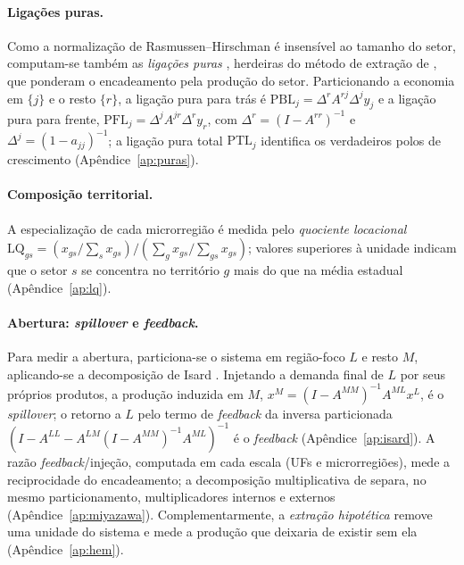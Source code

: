 \documentclass[11pt,a4paper]{article}
\begin{document}
\paragraph{Ligações puras.}
Como a normalização de Rasmussen--Hirschman é insensível ao tamanho do setor, computam-se
também as \emph{ligações puras} \citep{guilhoto2005linkages,millerblair2009}, herdeiras do
método de extração de \citet{cella1984}, que ponderam o encadeamento pela produção do setor.
Particionando a economia em $\{j\}$ e o resto $\{r\}$, a ligação pura para trás é
$\mathrm{PBL}_j=\Delta^{r}A^{rj}\Delta^{j}y_j$ e a ligação pura para frente,
$\mathrm{PFL}_j=\Delta^{j}A^{jr}\Delta^{r}y_r$, com $\Delta^{r}=(I-A^{rr})^{-1}$ e
$\Delta^{j}=(1-a_{jj})^{-1}$; a ligação pura total $\mathrm{PTL}_j$ identifica os verdadeiros
polos de crescimento (Apêndice~\ref{ap:puras}).

\paragraph{Composição territorial.}
A especialização de cada microrregião é medida pelo \emph{quociente locacional}
$\mathrm{LQ}_{gs}=(x_{gs}/\sum_s x_{gs})/(\sum_g x_{gs}/\sum_{gs}x_{gs})$; valores
superiores à unidade indicam que o setor $s$ se concentra no território $g$ mais do que na
média estadual (Apêndice~\ref{ap:lq}).

\paragraph{Abertura: \emph{spillover} e \emph{feedback}.}
Para medir a abertura, particiona-se o sistema em região-foco $L$ e resto $M$, aplicando-se
a decomposição de Isard \citep{isard1951,millerblair2009}. Injetando a demanda final de $L$
por seus próprios produtos, a produção induzida em $M$,
$x^{M}=(I-A^{MM})^{-1}A^{ML}x^{L}$, é o \emph{spillover}; o retorno a $L$ pelo termo de
\emph{feedback} da inversa particionada $(I-A^{LL}-A^{LM}(I-A^{MM})^{-1}A^{ML})^{-1}$ é o
\emph{feedback} (Apêndice~\ref{ap:isard}). A razão \emph{feedback}/injeção, computada em cada
escala (UFs e microrregiões), mede a reciprocidade do encadeamento; a decomposição
multiplicativa de \citet{miyazawa1966} separa, no mesmo particionamento, multiplicadores
internos e externos (Apêndice~\ref{ap:miyazawa}). Complementarmente, a \emph{extração
hipotética} \citep{dietzenbacher1993} remove uma unidade do sistema e mede a produção que
deixaria de existir sem ela (Apêndice~\ref{ap:hem}).

\end{document}
